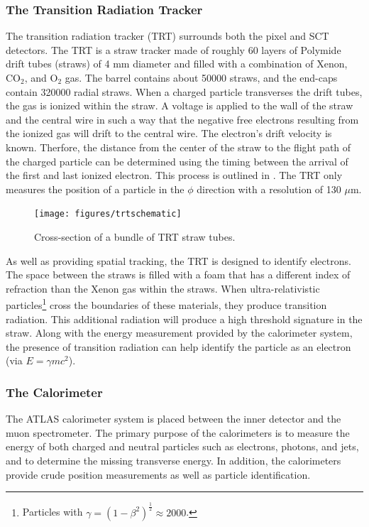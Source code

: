 \subsubsection*{The Transition Radiation Tracker}
The transition radiation tracker (TRT) surrounds both the pixel and SCT detectors.
The TRT is a straw tracker made of roughly 60 layers of 
Polymide drift tubes (straws) of 4 mm diameter and filled with a combination
of Xenon, CO$_2$, and O$_2$ gas. 
The barrel contains about 50000 straws, and the end-caps contain 320000 radial straws.
When a charged particle transverses the drift tubes, the gas is ionized within
the straw. A voltage is applied to the wall of the straw and the central wire in
such a way that the negative free electrons resulting from the ionized gas
will drift to the central wire. The electron's drift velocity is known. Therfore,
the distance from the center of the straw to the flight path of the charged
particle can be determined using the timing between the arrival of the first
and last ionized electron. This process is outlined in . The
TRT only measures the position of a particle in the $\phi$ direction with
a resolution of 130 $\mu$m.

\begin{figure}[!hbpt]
  \centering
  \texttt{[image: figures/trtschematic]}
  \caption{Cross-section of a bundle of TRT straw tubes.}
  \label{fig:trt}
\end{figure}

As well as providing spatial tracking, the TRT is designed to identify
electrons. The space between the straws is filled with a foam that has
a different index of refraction than the Xenon gas within the straws. When
ultra-relativistic particles\footnote{Particles with $\gamma = (1 - \beta^2)^{\frac{1}{2}} \approx 2000$.} cross the boundaries of these materials, they produce
transition radiation. This additional radiation will produce a high threshold
signature in the straw. Along with the energy measurement provided by the
calorimeter system, the presence of transition radiation can help identify
the particle as an electron (via $E = \gamma m c^2$).
 

\subsubsection{The Calorimeter}
\label{subsubsec:calo}
The ATLAS calorimeter system is placed between the inner detector and the muon
spectrometer. The primary purpose of the calorimeters is to measure the energy
of both charged and neutral particles such as electrons, photons, and jets, 
and to determine the missing transverse energy. 
In addition, the calorimeters provide crude position measurements
as well as particle identification.

